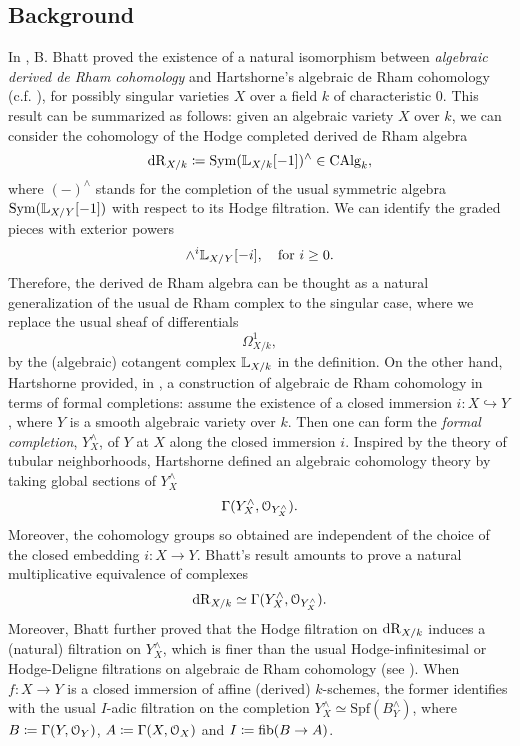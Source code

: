 \documentclass[10pt,a4paper,reqno]{amsart} %
\theoremstyle{plain}
\theoremstyle{definition}
\theoremstyle{remark}
\numberwithin{equation}{section}
\begin{document}
\subsection{Background}
In \cite{Bhatt_Derived_Completions}, B. Bhatt proved the existence of a natural isomorphism between \emph{algebraic derived de Rham cohomology}
and Hartshorne's algebraic de Rham cohomology (c.f. \cite{hartshorne1975rham}), for possibly singular varieties $X$ over a field $k$ of characteristic $0$.
This result can be summarized as follows: given an algebraic variety $X$ over $k$, we can consider the cohomology
of the Hodge completed derived de Rham algebra
    \[
        \mathrm{dR}_{X/ k} \coloneqq  \operatorname{Sym}(\mathbb L_{X/ k}[-1])^\wedge \in \mathrm{CAlg}_k,  
    \]
where $(-)^\wedge$ stands for the completion of the usual symmetric algebra $\operatorname{Sym}(\mathbb L_{X/ Y}[-1])$ with respect to its Hodge filtration. We can identify
the graded pieces with exterior powers
    \[
        \wedge^i \mathbb L_{X/ Y} [-i], \quad \mathrm{for} \ i \ge 0.  
    \]
Therefore, the derived de Rham algebra can be thought as a natural generalization of the usual de Rham complex to the singular case, where we replace the usual sheaf of differentials
    \[
        \Omega^1_{X/ k},  
    \]
by the (algebraic) cotangent complex $\mathbb L_{X/ k}$ in the definition.
On the other hand, Hartshorne provided, in \cite{hartshorne1975rham}, a construction of algebraic de Rham cohomology in terms
of formal completions: assume the existence of a closed immersion
$i \colon X \hookrightarrow Y$, where $Y$ is a smooth algebraic variety over $k$. Then one can form the \emph{formal completion}, $Y^\wedge_X$, of $Y$ at $X$ along the closed immersion $i$. Inspired by the theory of tubular neighborhoods, Hartshorne defined an algebraic cohomology theory
by taking global sections of $Y_X^\wedge$
    \[
        \Gamma(Y^\wedge_X, \mathcal O_{Y^\wedge_X}).    
    \]
Moreover, the cohomology groups so obtained are independent of the choice of the closed embedding $i \colon  X\to Y$.
Bhatt's result amounts to prove a natural multiplicative equivalence of complexes
    \[
        \mathrm{dR}_{X/k} \simeq  \Gamma(Y^\wedge_X, \mathcal O_{Y^\wedge_X}).
    \]
Moreover, Bhatt further proved that the Hodge filtration on $\mathrm{dR}_{X/ k}$ induces a (natural) filtration on $Y^\wedge_X$, which is finer than the usual
Hodge-infinitesimal or Hodge-Deligne filtrations on algebraic de Rham cohomology (see \cite{Bhatt_Derived_Completions}). When $f \colon X \to Y$ is a closed immersion of affine (derived) $k$-schemes, the
former identifies with the usual $I$-adic filtration on the completion $Y^\wedge_X \simeq \mathrm{Spf} (B^\wedge_Y)$, where $B \coloneqq \Gamma(Y, \mathcal O_Y)$,
$A \coloneqq \Gamma(X, \mathcal O_X)$ and $I \coloneqq \mathrm{fib}(B \to A)$.
\end{document}
